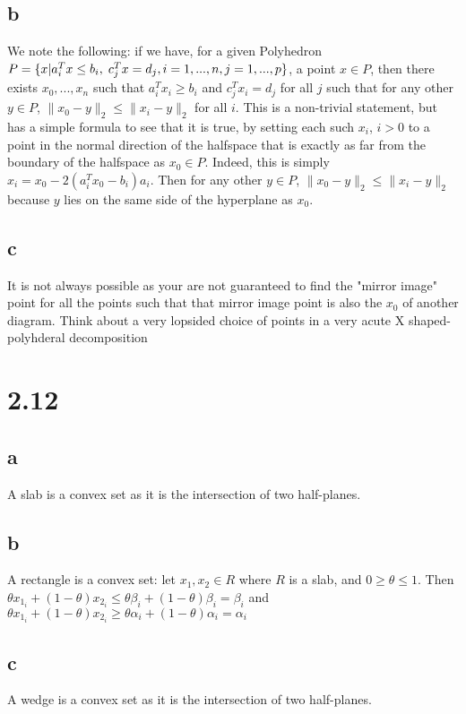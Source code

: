 \documentclass{article}
\begin{document}
\subsection*{b}
We note the following: if we have, for a given Polyhedron $P = \{x | a_i^Tx \leq b_i,\hspace{1mm} c_j^Tx = d_j, i = 1,...,n, j=1,...,p\}$, a point $x \in P$, then there exists $x_0,...,x_n$ such that $a_i^Tx_i \geq b_i$ and $c_j^Tx_i = d_j$ for all $j$ such that for any other $y \in P$, $\|x_0 - y\|_2 \leq \|x_i - y\|_2$ for all $i$.  This is a non-trivial statement, but has a simple formula to see that it is true, by setting each such $x_i$, $i > 0$ to a point in the normal direction of the halfspace that is exactly as far from the boundary of the halfspace as $x_0 \in P$. Indeed, this is simply $x_i = x_0 - 2(a_i^Tx_0 - b_i)a_i $. Then for any other $y \in P$, $\|x_0 - y\|_2 \leq \|x_i - y\|_2$ because $y$ lies on the same side of the hyperplane as $x_0$.  
\subsection*{c}
It is not always possible as your are not guaranteed to find the "mirror image" point for all the points such that that mirror image point is also the $x_0$ of another diagram.  Think about a very lopsided choice of points in a very acute X shaped-polyhderal decomposition

\section*{2.12}
\subsection*{a}
A slab is a convex set as it is the intersection of two half-planes.
\subsection*{b}
A rectangle is a convex set: let $x_1, x_2 \in R$ where $R$ is a slab, and $0 \geq \theta \leq 1$. Then $\theta x_1_i + (1-\theta) x_2_i \leq \theta \beta_i + (1-\theta) \beta_i = \beta_i$ and $\theta x_1_i + (1-\theta) x_2_i \geq \theta \alpha_i + (1-\theta) \alpha_i = \alpha_i$
\subsection*{c}
A wedge is a convex set as it is the intersection of two half-planes.
\end{document}

